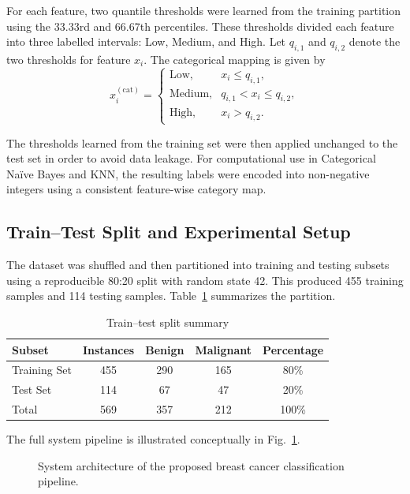 \documentclass[conference]{IEEEtran}
\begin{document}
For each feature, two quantile thresholds were learned from the training partition using the 33.33rd and 66.67th percentiles. These thresholds divided each feature into three labelled intervals: Low, Medium, and High. Let $q_{i,1}$ and $q_{i,2}$ denote the two thresholds for feature $x_i$. The categorical mapping is given by
\begin{equation}
x_i^{(\mathrm{cat})} =
\begin{cases}
\text{Low}, & x_i \leq q_{i,1},\\
\text{Medium}, & q_{i,1} < x_i \leq q_{i,2},\\
\text{High}, & x_i > q_{i,2}.
\end{cases}
\end{equation}

The thresholds learned from the training set were then applied unchanged to the test set in order to avoid data leakage. For computational use in Categorical Na\"ive Bayes and KNN, the resulting labels were encoded into non-negative integers using a consistent feature-wise category map.

\subsection{Train--Test Split and Experimental Setup}
The dataset was shuffled and then partitioned into training and testing subsets using a reproducible 80:20 split with random state 42. This produced 455 training samples and 114 testing samples. Table~\ref{tab:split} summarizes the partition.

\begin{table}[!t]
\caption{Train--test split summary}
\label{tab:split}
\centering
\begin{tabular}{lcccc}
\toprule
Subset & Instances & Benign & Malignant & Percentage \\
\midrule
Training Set & 455 & 290 & 165 & 80\% \\
Test Set & 114 & 67 & 47 & 20\% \\
Total & 569 & 357 & 212 & 100\% \\
\bottomrule
\end{tabular}
\end{table}

The full system pipeline is illustrated conceptually in Fig.~\ref{fig:pipeline}.

\begin{figure}[!t]
\centering
{}
\caption{System architecture of the proposed breast cancer classification pipeline.}
\label{fig:pipeline}
\end{figure}
\end{document}
